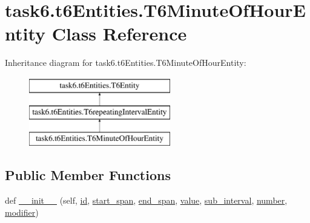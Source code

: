 \hypertarget{classtask6_1_1t6Entities_1_1T6MinuteOfHourEntity}{}\section{task6.\+t6\+Entities.\+T6\+Minute\+Of\+Hour\+Entity Class Reference}
\label{classtask6_1_1t6Entities_1_1T6MinuteOfHourEntity}
Inheritance diagram for task6.\+t6\+Entities.\+T6\+Minute\+Of\+Hour\+Entity\+:\begin{figure}[H]
\begin{center}
\leavevmode
\includegraphics[height=3.000000cm]{classtask6_1_1t6Entities_1_1T6MinuteOfHourEntity}
\end{center}
\end{figure}
\subsection*{Public Member Functions}
\begin{DoxyCompactItemize}
\item 
def \hyperlink{classtask6_1_1t6Entities_1_1T6MinuteOfHourEntity_a927ef60688052a692beea14ebb684e2c}{\+\_\+\+\_\+init\+\_\+\+\_\+} (self, \hyperlink{classtask6_1_1t6Entities_1_1T6Entity_afeeced8134bb3ebe0cfecc64d0ab46a4}{id}, \hyperlink{classtask6_1_1t6Entities_1_1T6Entity_a52779e9af8864dc98e8b02fc5b9b041a}{start\+\_\+span}, \hyperlink{classtask6_1_1t6Entities_1_1T6Entity_aeb402200b156cd9562c5111dfe777b98}{end\+\_\+span}, \hyperlink{classtask6_1_1t6Entities_1_1T6MinuteOfHourEntity_abee1ba303976b6122dcf778c9e8763c6}{value}, \hyperlink{classtask6_1_1t6Entities_1_1T6MinuteOfHourEntity_a4c7879676d773211ec35ac3096b5d556}{sub\+\_\+interval}, \hyperlink{classtask6_1_1t6Entities_1_1T6MinuteOfHourEntity_a73b6e272b0a5092d03ddce3cf1745821}{number}, \hyperlink{classtask6_1_1t6Entities_1_1T6MinuteOfHourEntity_a1151c9a18ebeb805d6c8233f26d796b2}{modifier})
\end{DoxyCompactItemize}
